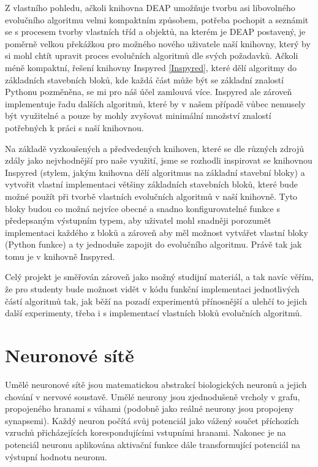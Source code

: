 Z vlastního pohledu, ačkoli knihovna DEAP umožňuje tvorbu asi
libovolného evolučního algoritmu velmi kompaktním způsobem, potřeba pochopit a
seznámit se s procesem tvorby vlastních tříd a objektů, na kterém je DEAP
postavený, je poměrně velkou překážkou pro možného nového uživatele naší
knihovny, který by si mohl chtít upravit proces evolučních algoritmů dle
svých požadavků. Ačkoli méně kompaktní, řešení knihovny Inspyred
\ref{Inspyred}, které dělí algoritmy do základních stavebních bloků, kde každá
část může být se základní znalostí Pythonu pozměněna, se mi pro náš účel
zamlouvá více. Inspyred ale zároveň implementuje řadu dalších algoritmů, které
by v našem případě vůbec nemusely být využitelné a pouze by mohly zvyšovat
minimální množství znalostí potřebných k práci s naší knihovnou.

Na základě vyzkoušených a předvedených knihoven, které se dle různých zdrojů
\citep{fortin2012deap} zdály jako nejvhodnější pro naše využití, jsme se
rozhodli inspirovat se knihovnou Inspyred (stylem, jakým knihovna dělí
algoritmus na základní stavební bloky) a vytvořit vlastní implementaci většiny
základních stavebních bloků, které bude možné použít při tvorbě vlastních
evolučních algoritmů v naší knihovně. Tyto bloky budou co možná nejvíce obecné
a snadno konfigurovatelné funkce s předepsaným výstupním typem, aby uživatel
mohl snadněji porozumět implementaci každého z bloků a zároveň aby měl možnost
vytvářet vlastní bloky (Python funkce) a ty jednoduše zapojit do evolučního
algoritmu. Právě tak jak tomu je v knihovně Inspyred. 

Celý projekt je směřován zároveň jako možný studijní materiál, a tak navíc
věřím, že pro studenty bude možnost vidět v kódu funkční implementaci
jednotlivých částí algoritmů tak, jak běží na pozadí experimentů přínosnější a
ulehčí to jejich další experimenty, třeba i s implementací vlastních bloků
evolučních algoritmů.

\section{Neuronové sítě} \label{NN}
Umělé neuronové sítě jsou matematickou abstrakcí biologických neuronů a jejich
chování v nervové soustavě. Umělé neurony jsou zjednodušeně vrcholy v grafu,
propojeného hranami s váhami (podobně jako reálné neurony jsou propojeny
synapsemi). Každý neuron počítá svůj potenciál jako vážený součet příchozích
vzruchů přicházejících korespondujícími vstupními hranami. Nakonec je
na potenciál neuronu aplikována aktivační funkce dále transformující
potenciál na výstupní hodnotu neuronu.

